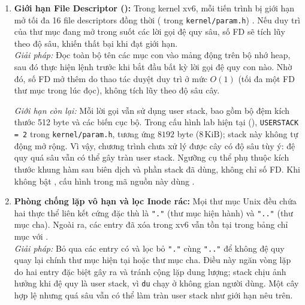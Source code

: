 \begin{enumerate}[noitemsep, topsep=2pt]
    \item \textbf{Giới hạn File Descriptor ():}
    Trong kernel xv6, mỗi tiến trình bị giới hạn mở tối đa 16 file descriptors đồng thời ( trong \texttt{kernel/param.h}) \cite{xv6book}. Nếu duy trì  của thư mục đang mở trong suốt các lời gọi đệ quy sâu, số FD sẽ tích lũy theo độ sâu, khiến  thất bại khi đạt giới hạn. \\
    \textit{Giải pháp:} Đọc toàn bộ tên các mục con vào mảng động  trên bộ nhớ heap, sau đó thực hiện lệnh  trước khi bắt đầu bất kỳ lời gọi đệ quy con nào. Nhờ đó, số FD mở thêm do thao tác duyệt duy trì ở mức $O(1)$ (tối đa một FD thư mục trong lúc đọc), không tích lũy theo độ sâu cây.

    \textit{Giới hạn còn lại:} Mỗi lời gọi  vẫn sử dụng user stack,
    bao gồm bộ đệm  kích thước 512 byte và các biến cục bộ.
    Trong cấu hình lab hiện tại (), \texttt{USERSTACK = 2} trong
    \texttt{kernel/param.h}, tương ứng $8192$ byte ($8\,\mathrm{KiB}$); stack này
    không tự động mở rộng. Vì vậy, chương trình chưa xử lý được cây có độ sâu tùy ý:
    đệ quy quá sâu vẫn có thể gây tràn user stack. Ngưỡng cụ thể phụ thuộc kích thước
    khung hàm sau biên dịch và phần stack đã dùng, không chỉ số FD. Khi không bật
    , cấu hình trong mã nguồn này dùng .

    \item \textbf{Phòng chống lặp vô hạn và lọc Inode rác:}
    Mọi thư mục Unix đều chứa hai thực thể liên kết cứng đặc thù là \texttt{"."} (thư mục hiện hành) và \texttt{".."} (thư mục cha). Ngoài ra, các entry đã xóa trong xv6 vẫn tồn tại trong bảng chỉ mục với . \\
    \textit{Giải pháp:} Bỏ qua các entry có  và lọc bỏ
    \texttt{"."} cùng \texttt{".."} để không đệ quy quay lại chính thư mục hiện tại
    hoặc thư mục cha. Điều này ngăn vòng lặp do hai entry đặc biệt gây ra và tránh
    cộng lặp dung lượng; stack chịu ảnh hưởng khi đệ quy là user stack, vì
    \texttt{du} chạy ở không gian người dùng. Một cây hợp lệ nhưng quá sâu vẫn có
    thể làm tràn user stack như giới hạn nêu trên.


\end{enumerate}
